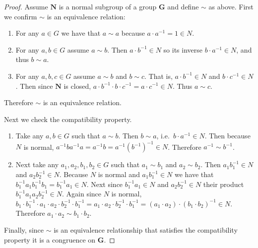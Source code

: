 \begin{proof}
  Assume $\mathbf{N}$ is a normal subgroup of a group $\mathbf{G}$ and define $\sim$ as above.
  First we confirm $\sim$ is an equivalence relation:
  \begin{enumerate}
    \item
      For any $a \in G$ we have that $a \sim a$ because $a\cdot a^{-1} = 1 \in N$.
    \item
      For any $a, b \in G$ assume $a \sim b$.
      Then $a\cdot b^{-1} \in N$ so its inverse $b\cdot a^{-1}\in N$, and thus $b \sim a$.
    \item
      For any $a, b, c \in G$ assume $a \sim b$ and $b \sim c$.
      That is, $a\cdot b^{-1} \in N$ and $b\cdot c^{-1} \in N$.
      Then since $\mathbf{N}$ is closed, $a\cdot b^{-1}\cdot b\cdot c^{-1} = a \cdot c^{-1} \in N$.
      Thus $a\sim c$.
  \end{enumerate}
  Therefore $\sim$ is an equivalence relation.

  Next we check the compatibility property.
  \begin{enumerate}
    \item
      Take any $a, b \in G$ such that $a \sim b$.
      Then $b \sim a$, i.e.\ $b\cdot a^{-1} \in N$.
      Then because $N$ is normal, $a^{-1}ba^{-1}a = a^{-1}b = a^{-1}(b^{-1})^{-1} \in N$.
      Therefore $a^{-1} \sim b^{-1}$.                 
    \item
      Next take any $a_1, a_2, b_1, b_2 \in G$ such that $a_1 \sim b_1$ and $a_2 \sim b_2$.
      Then $a_1b_1^{-1} \in N$ and $a_2b_2^{-1} \in N$.
      Because $N$ is normal and $a_1b_1^{-1} \in N$ we have that $b_1^{-1}a_1b_1^{-1}b_1 = b_1^{-1}a_1\in N$.
      Next since $b_1^{-1}a_1\in N$ and $a_2b_2^{-1} \in N$ their product $b_1^{-1}a_1a_2b_2^{-1} \in N$.
      Again since $N$ is normal, $b_1\cdot b_1^{-1}\cdot a_1\cdot a_2\cdot b_2^{-1}\cdot b_1^{-1} = a_1\cdot a_2\cdot b_2^{-1}\cdot b_1^{-1} = (a_1\cdot a_2)\cdot(b_1\cdot b_2)^{-1} \in N$.
      Therefore $a_1\cdot a_2 \sim b_1\cdot b_2$.
  \end{enumerate}
  Finally, since $\sim$ is an equivalence relationship that satisfies the compatibility property it is a congruence on $\mathbf{G}$.
\end{proof}